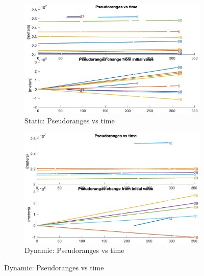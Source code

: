         \begin{figure}[h!]
            \centering
            \begin{subfigure}{0.23\textwidth}
                \includegraphics[width=\textwidth]{images/tests/Monte_Cappuccini/png/Samsung_A51_Monte_Cappuccini_fig1.png}
                \caption{Static: Pseudoranges vs time}
                \label{fig:static_pseudoranges_a}
            \end{subfigure}
            \hfill
            \begin{subfigure}{0.23\textwidth}
                \includegraphics[width=\textwidth]{images/tests/Tram_15_trip_Castello_to_Pescatore/filtered/Samsung_A51_Tram_15_trip_Castello_to_Pescatore_fig1.png}
                \caption{Dynamic: Pseudoranges vs time}
                \label{fig:static_pseudoranges_b}
            \end{subfigure}
        \end{figure}
    

